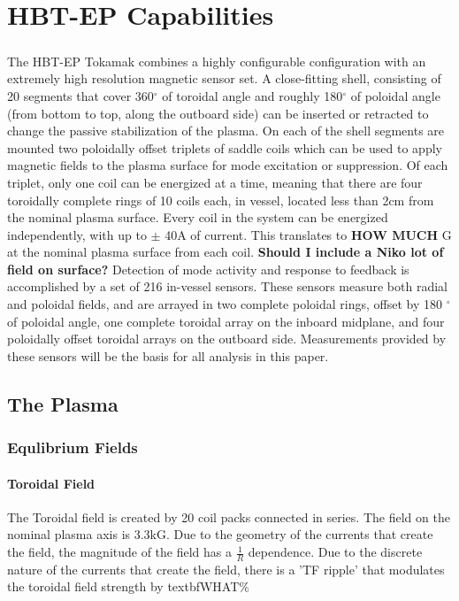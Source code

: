 \chapter{HBT-EP Capabilities}
\paragraph{}The HBT-EP Tokamak combines a highly configurable configuration with an extremely high resolution magnetic sensor set.  A close-fitting shell, consisting of 20 segments that cover 360$^{\circ}$ of toroidal angle and roughly 180$^{\circ}$ of poloidal angle (from bottom to top, along the outboard side) can be inserted or retracted to change the passive stabilization of the plasma.  On each of the shell segments are mounted two poloidally offset triplets of saddle coils which can be used to apply magnetic fields to the plasma surface for mode excitation or suppression.  Of each triplet, only one coil can be energized at a time, meaning that there are four toroidally complete rings of 10 coils each, in vessel, located less than 2cm from the nominal plasma surface.  Every coil in the system can be energized independently, with up to $\pm$ 40A of current.  This translates to \textbf{HOW MUCH} G at the nominal plasma surface from each coil.  \textbf{Should I include a Niko lot of field on surface?}  Detection of mode activity and response to feedback is accomplished by a set of 216 in-vessel sensors.  These sensors measure both radial and poloidal fields, and are arrayed in two complete poloidal rings, offset by 180 $^{\circ}$ of poloidal angle, one complete toroidal array on the inboard midplane, and four poloidally offset toroidal arrays on the outboard side.  Measurements provided by these sensors will be the basis for all analysis in this paper.
\section{The Plasma}
\subsection{Equlibrium Fields}
\subsubsection{Toroidal Field}
The Toroidal field is created by 20 coil packs connected in series.  The field on the nominal plasma axis is 3.3kG.  Due to the geometry of the currents that create the field, the magnitude of the field has a $\frac{1}{R}$ dependence.  Due to the discrete nature of the currents that create the field, there is a 'TF ripple' that modulates the toroidal field strength by textbf{WHAT}$\%$
